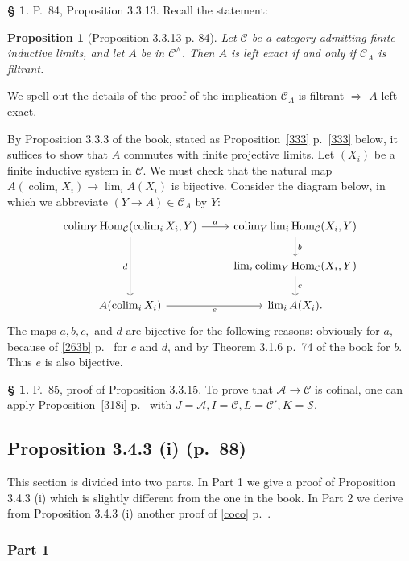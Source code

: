 \documentclass[12pt]{article}%
\newtheorem{prop}[thm]{Proposition}
\theoremstyle{remark}
\theoremstyle{definition}
\newtheorem{s}[thm]{\S}%
\newcommand{\cc}{\mathcal}
\newcommand{\A}{\mathcal A}
\newcommand{\C}{\mathcal C}
\newcommand{\then}{\Rightarrow}
\DeclareMathOperator*{\colim}{colim}%
\DeclareMathOperator{\Hom}{Hom}%
\begin{document}
\begin{s}
P.~84, Proposition 3.3.13. Recall the statement:

\begin{prop}[Proposition 3.3.13 p. 84]
Let $\C$ be a category admitting finite inductive limits, and let $A$ be in $\C^\wedge$. Then $A$ is left exact if and only if $\C_A$ is filtrant.
\end{prop}

We spell out the details of the proof of the implication $\C_A$ is filtrant $\then$ $A$ left exact.

By Proposition 3.3.3 of the book, stated as Proposition~\ref{333} p.~\ref{333} below, it suffices to show that $A$ commutes with finite projective limits. Let $(X_i)$ be a finite inductive system in $\C$. We must check that the natural map $A(\colim_i X_i)\to\lim_iA(X_i)$ is bijective. Consider the diagram below, in which we abbreviate $(Y\to A)\in\C_A$ by $Y$: 
$$
\begin{tikzcd}
\colim_Y\Hom_\C(\colim_iX_i,Y)\ar{r}{a}\ar{dd}[swap]{d}&\colim_Y\lim_i\Hom_\C(X_i,Y)\ar{d}{b}\\ 
{}&\lim_i\colim_Y\Hom_\C(X_i,Y)\ar{d}{c}\\ 
A(\colim_iX_i)\ar{r}[swap]{e}&\lim_iA(X_i).
\end{tikzcd}
$$ 
The maps $a,b,c,$ and $d$ are bijective for the following reasons: obviously for $a$, because of \eqref{263b} p.~\pageref{263b} for $c$ and $d$, and by Theorem 3.1.6 p.~74 of the book for $b$. Thus $e$ is also bijective.
\end{s}

%

\begin{s}\label{3315}
P.~85, proof of Proposition 3.3.15. To prove that $\A\to\C$ is cofinal, one can apply Proposition~\ref{318i} p.~\pageref{318i} with $J=\A,I=\C,L=\C',K=\cc S$. 
\end{s}


\subsection{Proposition 3.4.3 (i) (p.~88)}

This section is divided into two parts. In Part 1 we give a proof of Proposition 3.4.3 (i) which is slightly different from the one in the book. In Part 2 we derive from Proposition 3.4.3 (i) another proof of \eqref{coco} p.~\pageref{coco}. 

\subsubsection{Part 1} 
\end{document}
